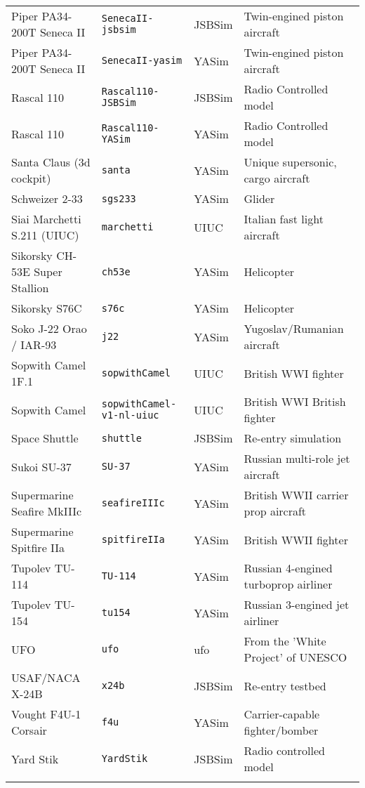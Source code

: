 \begin{tabular}{l|l|l|l}
   Piper PA34-200T Seneca II & \texttt{SenecaII-jsbsim} & JSBSim & Twin-engined piston aircraft\\
   Piper PA34-200T Seneca II & \texttt{SenecaII-yasim} & YASim & Twin-engined piston aircraft\\
   Rascal 110       & \texttt{Rascal110-JSBSim} & JSBSim & Radio Controlled model\\
   Rascal 110       & \texttt{Rascal110-YASim} & YASim & Radio Controlled model\\
   Santa Claus (3d cockpit) & \texttt{santa} & YASim & Unique supersonic, cargo aircraft\\
   Schweizer 2-33 & \texttt{sgs233} & YASim & Glider\\
   Siai Marchetti S.211 (UIUC) & \texttt{marchetti} & UIUC & Italian fast light aircraft\\
   Sikorsky CH-53E Super Stallion & \texttt{ch53e} & YASim & Helicopter\\
   Sikorsky S76C & \texttt{s76c} & YASim & Helicopter\\
   Soko J-22 Orao / IAR-93 & \texttt{j22} & YASim & Yugoslav/Rumanian aircraft\\
   Sopwith Camel 1F.1 & \texttt{sopwithCamel} & UIUC & British WWI fighter\\
   Sopwith Camel & \texttt{sopwithCamel-v1-nl-uiuc} & UIUC & British WWI British fighter\\
   Space Shuttle & \texttt{shuttle} & JSBSim & Re-entry simulation\\
   Sukoi SU-37      & \texttt{SU-37} & YASim & Russian multi-role jet aircraft\\
   Supermarine Seafire MkIIIc & \texttt{seafireIIIc} & YASim & British WWII carrier prop aircraft\\
   Supermarine Spitfire IIa & \texttt{spitfireIIa} & YASim & British WWII fighter \\
   Tupolev TU-114 & \texttt{TU-114} & YASim & Russian 4-engined turboprop airliner\\
   Tupolev TU-154 & \texttt{tu154} & YASim & Russian 3-engined jet airliner\\
   UFO& \texttt{ufo} & ufo &  From the 'White Project' of UNESCO \\
   USAF/NACA X-24B & \texttt{x24b} & JSBSim & Re-entry testbed\\
   Vought F4U-1 Corsair & \texttt{f4u} & YASim & Carrier-capable fighter/bomber\\
   Yard Stik & \texttt{YardStik} & JSBSim & Radio controlled model \\
   \\
\end{tabular}

